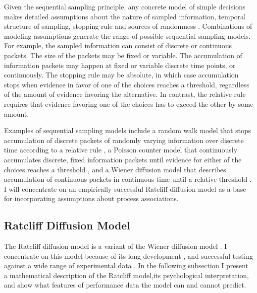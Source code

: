 \documentclass[12pt]{article}
\begin{document}
Given the sequential sampling principle, any concrete model of simple
decisions makes detailed assumptions about the nature of sampled
information, temporal structure of sampling, stopping rule and sources of
randomness \citep{RatSmi2004,BogBro2006,TeoUsh2013}. Combinations of
modeling assumptions generate the range of possible sequential sampling
models. For example, the sampled information can consist of discrete or
continuous packets. The size of the packets may be fixed or variable. The
accumulation of information packets may happen at fixed or variable
discrete time points, or continuously. The stopping rule may be absolute,
in which case accumulation stops when evidence in favor of one of the
choices reaches a threshold, regardless of the amount of evidence favoring
the alternative. In contrast, the relative rule requires that evidence
favoring one of the choices has to exceed the other by some amount.
    
Examples of sequential sampling models include a random walk model that
stops accumulation of discrete packets of randomly varying information over
discrete time according to a relative rule \citep{Lam1968}, a Poisson
counter model that continuously accumulates discrete, fixed information
packets until evidence for either of the choices reaches a threshold
\citep{Lab1962}, and a Wiener diffusion model that describes accumulation
of continuous packets in continuous time until a relative threshold
\citep{Rat1978}. I will concentrate on an empirically successful Ratcliff
diffusion model \citep{RatTue2002} as a base for incorporating assumptions
about process associations.
    
\subsection{Ratcliff Diffusion Model}

The Ratcliff diffusion model is a variant of the Wiener diffusion model
\citep{Lam1968,LinHea1975,Rat1978,RatRou1998,RatTue2002}. I
concentrate on this model because of its long development \citep{Rat1978,RatRou1998,Rat2002,RatTue2002,Rat2013}, and successful
testing against a wide range of experimental data \citep{RatMck2008,Wag2009}. In the following subsection I present a mathematical description of the Ratcliff model,its psychological interpretation, and show what features of performance data the model can and cannot predict.
    
\end{document}
